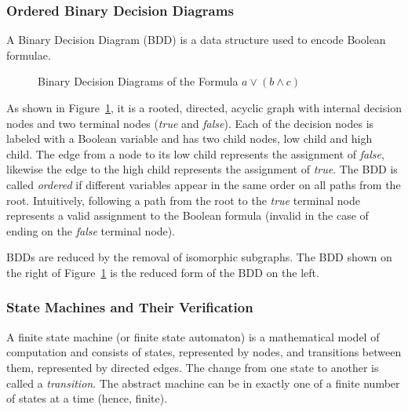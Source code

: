 \subsubsection{Ordered Binary Decision Diagrams}
A Binary Decision Diagram (BDD) is a data structure used to encode Boolean formulae.
\begin{figure}[htbp]
        \caption{\label{fig:bdd} Binary Decision Diagrams of the Formula $a \lor (b \land c)$}
\end{figure}
As shown in Figure~\ref{fig:bdd}, it is a rooted, directed, acyclic graph with internal decision nodes and two terminal nodes (\textit{true} and \textit{false}). Each of the decision nodes is labeled with a Boolean variable and has two child nodes, low child and high child. The edge from a node to its low child represents the assignment of \textit{false}, likewise the edge to the high child represents the assignment of \textit{true}. The BDD is called \textit{ordered} if different variables appear in the same order on all paths from the root. Intuitively, following a path from the root to the \textit{true} terminal node represents a valid assignment to the Boolean formula (invalid in the case of ending on the \textit{false} terminal node). 

BDDs are reduced by the removal of isomorphic subgraphs. The BDD shown on the right of Figure~\ref{fig:bdd} is the reduced form of the BDD on the left.

\subsubsection{State Machines and Their Verification}
A finite state machine (or finite state automaton) is a mathematical model of computation and consists of states, represented by nodes, and transitions between them, represented by directed edges. The change from one state to another is called a {\em transition}. The abstract machine can be in exactly one of a finite number of states at a time (hence, finite). 

